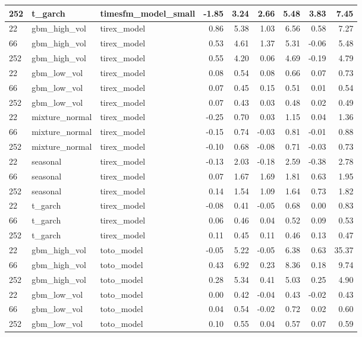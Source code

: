 {\begin{tabular}{lllrrrrrr}
252 & t\_garch & timesfm\_model\_small & -1.85 & 3.24 & 2.66 & 5.48 & 3.83 & 7.45 \\
\midrule
22 & gbm\_high\_vol & tirex\_model & 0.86 & 5.38 & 1.03 & 6.56 & 0.58 & 7.27 \\
66 & gbm\_high\_vol & tirex\_model & 0.53 & 4.61 & 1.37 & 5.31 & -0.06 & 5.48 \\
252 & gbm\_high\_vol & tirex\_model & 0.55 & 4.20 & 0.06 & 4.69 & -0.19 & 4.79 \\
\midrule
22 & gbm\_low\_vol & tirex\_model & 0.08 & 0.54 & 0.08 & 0.66 & 0.07 & 0.73 \\
66 & gbm\_low\_vol & tirex\_model & 0.07 & 0.45 & 0.15 & 0.51 & 0.01 & 0.54 \\
252 & gbm\_low\_vol & tirex\_model & 0.07 & 0.43 & 0.03 & 0.48 & 0.02 & 0.49 \\
\midrule
22 & mixture\_normal & tirex\_model & -0.25 & 0.70 & 0.03 & 1.15 & 0.04 & 1.36 \\
66 & mixture\_normal & tirex\_model & -0.15 & 0.74 & -0.03 & 0.81 & -0.01 & 0.88 \\
252 & mixture\_normal & tirex\_model & -0.10 & 0.68 & -0.08 & 0.71 & -0.03 & 0.73 \\
\midrule
22 & seasonal & tirex\_model & -0.13 & 2.03 & -0.18 & 2.59 & -0.38 & 2.78 \\
66 & seasonal & tirex\_model & 0.07 & 1.67 & 1.69 & 1.81 & 0.63 & 1.95 \\
252 & seasonal & tirex\_model & 0.14 & 1.54 & 1.09 & 1.64 & 0.73 & 1.82 \\
\midrule
22 & t\_garch & tirex\_model & -0.08 & 0.41 & -0.05 & 0.68 & 0.00 & 0.83 \\
66 & t\_garch & tirex\_model & 0.06 & 0.46 & 0.04 & 0.52 & 0.09 & 0.53 \\
252 & t\_garch & tirex\_model & 0.11 & 0.45 & 0.11 & 0.46 & 0.13 & 0.47 \\
\midrule
22 & gbm\_high\_vol & toto\_model & -0.05 & 5.22 & -0.05 & 6.38 & 0.63 & 35.37 \\
66 & gbm\_high\_vol & toto\_model & 0.43 & 6.92 & 0.23 & 8.36 & 0.18 & 9.74 \\
252 & gbm\_high\_vol & toto\_model & 0.28 & 5.34 & 0.41 & 5.03 & 0.25 & 4.90 \\
\midrule
22 & gbm\_low\_vol & toto\_model & 0.00 & 0.42 & -0.04 & 0.43 & -0.02 & 0.43 \\
66 & gbm\_low\_vol & toto\_model & 0.04 & 0.54 & -0.02 & 0.72 & 0.02 & 0.60 \\
252 & gbm\_low\_vol & toto\_model & 0.10 & 0.55 & 0.04 & 0.57 & 0.07 & 0.59 \\

\end{tabular}}
